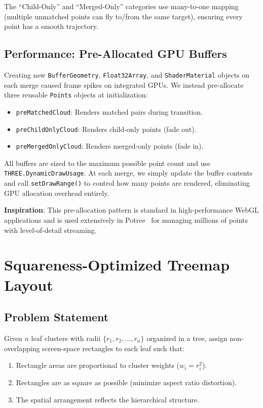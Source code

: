 \documentclass[11pt, letterpaper]{article}
\begin{document}
The ``Child-Only'' and ``Merged-Only'' categories use many-to-one mapping (multiple unmatched points can fly to/from the same target), ensuring every point has a smooth trajectory.

\subsection{Performance: Pre-Allocated GPU Buffers}

Creating new \texttt{BufferGeometry}, \texttt{Float32Array}, and \texttt{ShaderMaterial} objects on each merge caused frame spikes on integrated GPUs. We instead pre-allocate three reusable \texttt{Points} objects at initialization:

\begin{itemize}
    \item \texttt{preMatchedCloud}: Renders matched pairs during transition.
    \item \texttt{preChildOnlyCloud}: Renders child-only points (fade out).
    \item \texttt{preMergedOnlyCloud}: Renders merged-only points (fade in).
\end{itemize}

All buffers are sized to the maximum possible point count and use \texttt{THREE.DynamicDrawUsage}. At each merge, we simply update the buffer contents and call \texttt{setDrawRange()} to control how many points are rendered, eliminating GPU allocation overhead entirely.

\textbf{Inspiration}: This pre-allocation pattern is standard in high-performance WebGL applications and is used extensively in Potree~\cite{potree} for managing millions of points with level-of-detail streaming.

\section{Squareness-Optimized Treemap Layout}

\subsection{Problem Statement}

Given $n$ leaf clusters with radii $\{r_1, r_2, \ldots, r_n\}$ organized in a tree, assign non-overlapping screen-space rectangles to each leaf such that:
\begin{enumerate}
    \item Rectangle areas are proportional to cluster weights ($w_i = r_i^2$).
    \item Rectangles are as square as possible (minimize aspect ratio distortion).
    \item The spatial arrangement reflects the hierarchical structure.
\end{enumerate}
\end{document}

